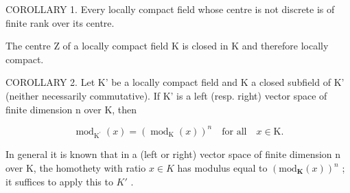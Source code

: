COROLLARY 1. Every locally compact field whose centre is not discrete is of finite rank over its centre.

The centre Z of a locally compact field K is closed in K and therefore locally compact.

COROLLARY 2. Let K' be a locally compact field and K a closed subfield of K' (neither necessarily commutative). If K' is a left (resp. right) vector space of finite dimension n over K, then

\[
\operatorname{mod} _ {\mathrm{K} ^ {\prime}} (x) = (\operatorname{mod} _ {\mathrm{K}} (x)) ^ {n} \quad \text {for all} \quad x \in \mathrm{K}.\tag{2}
\]

In general it is known that in a (left or right) vector space of finite dimension n over K, the homothety with ratio \(x \in K\) has modulus equal to \((\text{mod}_{\mathbf{K}}(x))^{n}\) ; it suffices to apply this to \(K'\) .

